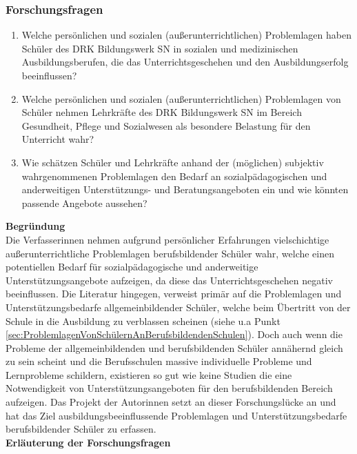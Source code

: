 \subsubsection{Forschungsfragen}
\label{sec:Forschungsfragen}

\begin{enumerate}
	\item Welche persönlichen und sozialen (außerunterrichtlichen) Problemlagen haben Schüler des DRK Bildungswerk SN in sozialen und medizinischen Ausbildungsberufen, die das Unterrichtsgeschehen und den Ausbildungserfolg beeinflussen?
	\item Welche persönlichen und sozialen (außerunterrichtlichen) Problemlagen von Schüler nehmen Lehrkräfte des DRK Bildungswerk SN im Bereich Gesundheit, Pflege und Sozialwesen als besondere Belastung für den Unterricht wahr?
	\item Wie schätzen Schüler und Lehrkräfte anhand der (möglichen) subjektiv wahrgenommenen Problemlagen den Bedarf an sozialpädagogischen und anderweitigen Unterstützungs- und Beratungsangeboten ein und wie könnten passende Angebote aussehen?
\end{enumerate}

\noindent
\textbf{Begründung}\\

\noindent
Die Verfasserinnen nehmen aufgrund persönlicher Erfahrungen vielschichtige außerunterrichtliche Problemlagen berufsbildender Schüler wahr, welche einen potentiellen Bedarf für sozialpädagogische und anderweitige Unterstützungsangebote aufzeigen, da diese das Unterrichtsgeschehen negativ beeinflussen. Die Literatur hingegen, verweist primär auf die Problemlagen und Unterstützungsbedarfe allgemeinbildender Schüler, welche beim Übertritt von der Schule in die Ausbildung zu verblassen scheinen (siehe u.a Punkt \ref{sec:ProblemlagenVonSchülernAnBerufsbildendenSchulen}). Doch auch wenn die Probleme der allgemeinbildenden und berufsbildenden Schüler annähernd gleich zu sein scheint und die Berufsschulen massive individuelle Probleme und Lernprobleme schildern, existieren so gut wie keine Studien die eine Notwendigkeit von Unterstützungsangeboten für den berufsbildenden Bereich aufzeigen. Das Projekt der Autorinnen setzt an dieser Forschungslücke an und hat das Ziel ausbildungsbeeinflussende Problemlagen und Unterstützungsbedarfe berufsbildender Schüler zu erfassen.\\

\newpage
\noindent
\textbf{Erläuterung der Forschungsfragen}\\

